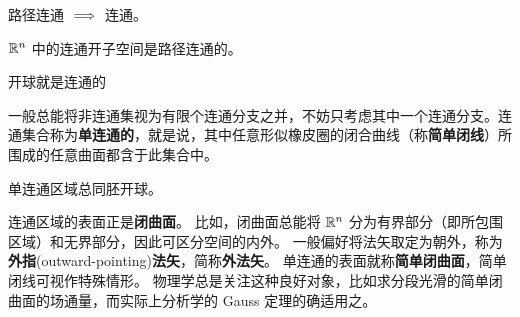 \begin{remark}
    路径连通 $\implies$ 连通。
\end{remark}

\begin{eg}
    $\mathbb{R}^{n}$ 中的连通开子空间是路径连通的。
\end{eg}

开球就是连通的

一般总能将非连通集视为有限个连通分支之并，不妨只考虑其中一个连通分支。连通集合称为\textbf{单连通的}，就是说，其中任意形似橡皮圈的闭合曲线（称\textbf{简单闭线}）所围成的任意曲面都含于此集合中。

单连通区域总同胚开球。


连通区域的表面正是\textbf{闭曲面}。
比如，闭曲面总能将 $\mathbb{R}^n$ 分为有界部分（即所包围区域）和无界部分，因此可区分空间的内外。
一般偏好将法矢取定为朝外，称为\textbf{外指}(outward-pointing)\textbf{法矢}，简称\textbf{外法矢}。
单连通的表面就称\textbf{简单闭曲面}，简单闭线可视作特殊情形。
物理学总是关注这种良好对象，比如求分段光滑的简单闭曲面的场通量，而实际上分析学的 Gauss 定理的确适用之。
